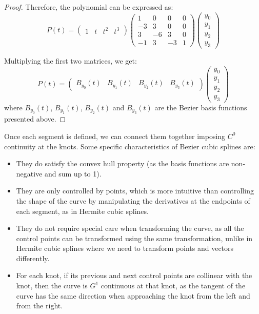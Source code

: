 \begin{proof}
    Therefore, the polynomial can be expressed as:
    \[P(t) =
    \begin{pmatrix}
        1 & t & t^2 & t^3
    \end{pmatrix}
    \begin{pmatrix}
    1 & 0 & 0 & 0 \\
    -3 & 3 & 0 & 0 \\
    3 & -6 & 3 & 0 \\
    -1 & 3 & -3 & 1
    \end{pmatrix}
    \begin{pmatrix}
        y_0 \\ y_1 \\ y_2 \\ y_3
    \end{pmatrix}\]
    
    Multiplying the first two matrices, we get:
    \[P(t) =
    \begin{pmatrix}
    B_{y_0}(t) & B_{y_1}(t) & B_{y_2}(t) & B_{y_3}(t)
    \end{pmatrix}
    \begin{pmatrix}
        y_0 \\ y_1 \\ y_2 \\ y_3
    \end{pmatrix}\]
    where $B_{y_0}(t)$, $B_{y_1}(t)$, $B_{y_2}(t)$ and $B_{y_3}(t)$ are the Bezier basis functions presented above.
\end{proof}

Once each segment is defined, we can connect them together imposing $C^0$ continuity at the knots. Some specific characteristics of Bezier cubic splines are:
\begin{itemize}
    \item They do satisfy the convex hull property (as the basis functions are non-negative and sum up to 1).
    \item They are only controlled by points, which is more intuitive than controlling the shape of the curve by manipulating the derivatives at the endpoints of each segment, as in Hermite cubic splines.
    \item They do not require special care when transforming the curve, as all the control points can be transformed using the same transformation, unlike in Hermite cubic splines where we need to transform points and vectors differently.
    \item For each knot, if its previous and next control points are collinear with the knot, then the curve is $G^1$ continuous at that knot, as the tangent of the curve has the same direction when approaching the knot from the left and from the right.
\end{itemize}

